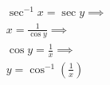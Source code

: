 \documentclass[preview]{standalone}
\begin{document}
\begin{align*}
\sec^{-1} x  = \sec y \implies \\              x = \frac{1}{\cos y} \implies \\              \cos y = \frac{1}{x} \implies \\              y = \cos^{-1}(\frac{1}{x})
\end{align*}
\end{document}

